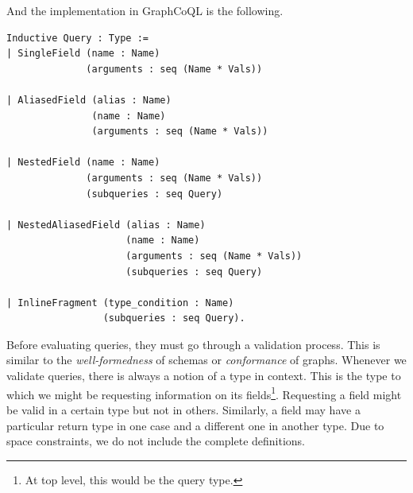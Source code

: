 And the implementation in GraphCoQL is the following.

\begin{verbatim}
Inductive Query : Type :=
| SingleField (name : Name)
              (arguments : seq (Name * Vals))

| AliasedField (alias : Name)
               (name : Name)
               (arguments : seq (Name * Vals))

| NestedField (name : Name)
              (arguments : seq (Name * Vals))
              (subqueries : seq Query)

| NestedAliasedField (alias : Name)
                     (name : Name)
                     (arguments : seq (Name * Vals))
                     (subqueries : seq Query)

| InlineFragment (type_condition : Name)
                 (subqueries : seq Query).
\end{verbatim}


Before evaluating queries, they must go through a validation process. This is similar to the \textit{well-formedness} of schemas or \textit{conformance} of graphs. Whenever we validate queries, there is always a notion of a type in context. This is the type to which we might be requesting information on its fields\footnote{At top level, this would be the query type.}. Requesting a field might be valid in a certain type but not in others. Similarly, a field may have a particular return type in one case and a different one in another type. Due to space constraints, we do not include the complete definitions.

